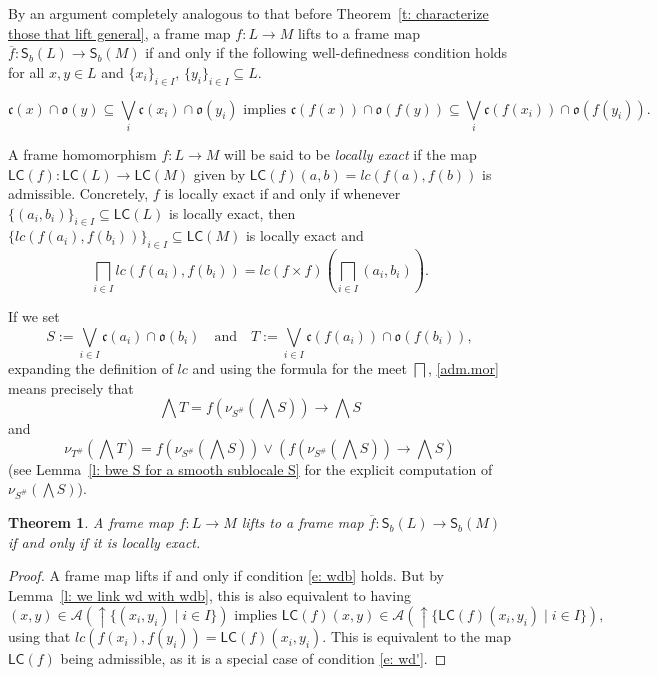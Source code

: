 \documentclass[11pt,a4paper,reqno]{amsart}
\newcommand{\tbigwedge}{\mathop{\textstyle \bigwedge }}%
\newcommand{\tbigsqcap}{\mathop{\textstyle \bigsqcap }}%
\newcommand{\tbigvee}{\mathop{\textstyle \bigvee }}%
\def\cl{\mathfrak{c}}
\def\op{\mathfrak{o}}
\newtheorem{theorem}{Theorem}[section]
\theoremstyle{definition}
\theoremstyle{remark}
\newcommand{\ca}[1]{\mathcal{#1}}
\newcommand{\mf}{\mathsf}
\newcommand{\mi}{\mathit}
\newcommand{\se}{\subseteq}
\newcommand{\Sb}{\mf{S}_b}
\newcommand{\up}{{\uparrow}}
\begin{document}
{By an argument completely analogous to that before Theorem~\ref{t: characterize those that lift general}, a frame map $f:L\to M$ lifts to a frame map $\overline{f}:\Sb(L)\to \Sb(M)$ if and only if the following well-definedness condition holds for all $x,y\in L$ and $\{x_i\}_{i\in I},\,\{y_i\}_{i\in I}\subseteq L$.


\begin{equation*}
\cl(x)\cap \op(y)\se \tbigvee_i \cl(x_i)\cap \op(y_i) \text{ implies }\cl(f(x))\cap \op(f(y))\se \tbigvee_i \cl(f(x_i))\cap \op(f(y_i)).   \tag{WDb}
\end{equation*}

A frame homomorphism $f\colon L\to M$ will be said to be \emph{locally exact} if the map $\mathsf{LC}(f)\colon \mathsf{LC}(L)\to\mathsf{LC}(M)$ given by $\mathsf{LC}(f)(a,b)=lc(f(a),f(b))$ is admissible. Concretely, $f$ is locally exact if and only if whenever $\{(a_i,b_i)\}_{i\in I}\subseteq \mathsf{LC}(L)$ is locally exact, then $\{ lc(f(a_i), f(b_i) )\}_{i\in I}\subseteq \mathsf{LC}(M)$ is locally exact and 
\begin{equation}\label{adm.mor}\tbigsqcap_{i\in I} lc(f(a_i), f(b_i)) = lc(f\times f)(\tbigsqcap_{i\in I} (a_i,b_i)).\end{equation}

If we set $$S:= \tbigvee_{i\in I} \cl(a_i)\cap \op(b_i)\quad \text{and} \quad T:= \tbigvee_{i\in I} \cl(f(a_i))\cap\op(f(b_i)),$$
expanding the definition of $\mi{lc}$ and using the formula for the meet $\tbigsqcap$, \eqref{adm.mor} means precisely that $$  \tbigwedge T=f(\nu_{S^\#}(\tbigwedge S ))\to\tbigwedge S $$
and $$\nu_{T^{\#}}(\tbigwedge T)=f(\nu_{S^\#}(\tbigwedge S ))\vee \left(f(\nu_{S^\#}(\tbigwedge S ))\to\tbigwedge S \right)$$
(see Lemma~\ref{l: bwe S for a smooth sublocale S} for the explicit computation of $\nu_{S^{\#}}(\tbigwedge S)$).
\begin{theorem}
A frame map $f:L\to M$ lifts to a frame map $\overline{f}:\Sb(L)\to \Sb(M)$ if and only if it is locally exact.
\end{theorem}
\begin{proof}
    A frame map lifts if and only if condition \eqref{e: wdb} holds. But by Lemma~\ref{l: we link wd with wdb}, this is also equivalent to having
    \[
    (x,y)\in \ca{A}(\up \{(x_i,y_i)\mid i\in I\})\text{ implies }\mf{LC}(f)(x,y)\in \ca{A}(\up \{\mf{LC}(f)(x_i,y_i)\mid i\in I\}),
    \]
    using that $\mi{lc}(f(x_i),f(y_i))=\mf{LC}(f)(x_i,y_i)$. This is equivalent to the map $\mf{LC}(f)$ being admissible, as it is a special case of condition \eqref{e: wd'}.
\end{proof}


}
\end{document}
